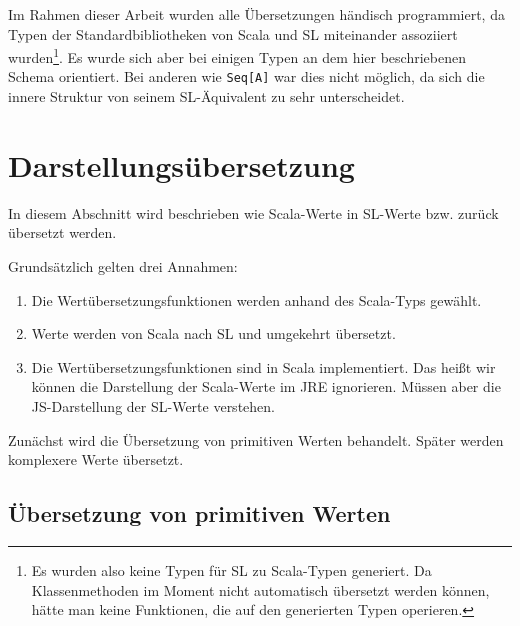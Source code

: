 \documentclass[12pt,bibtotoc]{scrreprt}
\begin{document}
Im Rahmen dieser Arbeit wurden alle Übersetzungen händisch programmiert, da Typen der Standardbibliotheken von Scala und SL miteinander assoziiert wurden\footnote{Es wurden also keine Typen für SL zu Scala-Typen generiert. Da Klassenmethoden im Moment nicht automatisch übersetzt werden können, hätte man keine Funktionen, die auf den generierten Typen operieren.}. Es wurde sich aber bei einigen Typen an dem hier beschriebenen Schema orientiert. Bei anderen wie \lstinline!Seq[A]! war dies nicht möglich, da sich die innere Struktur von seinem SL-Äquivalent zu sehr unterscheidet.


\section{Darstellungsübersetzung}
\label{sec:value-transformation}

In diesem Abschnitt wird beschrieben wie Scala-Werte in SL-Werte bzw. zurück übersetzt werden. 

Grundsätzlich gelten drei Annahmen: 
\begin{enumerate}
 \item Die Wertübersetzungsfunktionen werden anhand des Scala-Typs gewählt.
 \item Werte werden von Scala nach SL und umgekehrt übersetzt.
 \item Die Wertübersetzungsfunktionen sind in Scala implementiert. Das heißt wir können die Darstellung der Scala-Werte im JRE ignorieren. Müssen aber die JS-Darstellung der SL-Werte verstehen.
\end{enumerate}

Zunächst wird die Übersetzung von primitiven Werten behandelt. Später werden komplexere Werte übersetzt.

\subsection{Übersetzung von primitiven Werten}
\label{subsec:primitive-value-translation}
\end{document}
